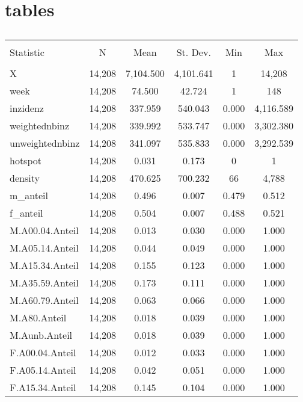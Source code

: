 \documentclass{article}
\begin{document}
\section{tables}

\begin{table}[!htbp] \centering 
  \caption{} 
  \label{} 
\begin{tabular}{@{\extracolsep{5pt}}lccccc} 
\\[-1.8ex]\hline 
\hline \\[-1.8ex] 
Statistic & \multicolumn{1}{c}{N} & \multicolumn{1}{c}{Mean} & \multicolumn{1}{c}{St. Dev.} & \multicolumn{1}{c}{Min} & \multicolumn{1}{c}{Max} \\ 
\hline \\[-1.8ex] 
X & 14,208 & 7,104.500 & 4,101.641 & 1 & 14,208 \\ 
week & 14,208 & 74.500 & 42.724 & 1 & 148 \\ 
inzidenz & 14,208 & 337.959 & 540.043 & 0.000 & 4,116.589 \\ 
weightednbinz & 14,208 & 339.992 & 533.747 & 0.000 & 3,302.380 \\ 
unweightednbinz & 14,208 & 341.097 & 535.833 & 0.000 & 3,292.539 \\ 
hotspot & 14,208 & 0.031 & 0.173 & 0 & 1 \\ 
density & 14,208 & 470.625 & 700.232 & 66 & 4,788 \\ 
m\_anteil & 14,208 & 0.496 & 0.007 & 0.479 & 0.512 \\ 
f\_anteil & 14,208 & 0.504 & 0.007 & 0.488 & 0.521 \\ 
M.A00.04.Anteil & 14,208 & 0.013 & 0.030 & 0.000 & 1.000 \\ 
M.A05.14.Anteil & 14,208 & 0.044 & 0.049 & 0.000 & 1.000 \\ 
M.A15.34.Anteil & 14,208 & 0.155 & 0.123 & 0.000 & 1.000 \\ 
M.A35.59.Anteil & 14,208 & 0.173 & 0.111 & 0.000 & 1.000 \\ 
M.A60.79.Anteil & 14,208 & 0.063 & 0.066 & 0.000 & 1.000 \\ 
M.A80.Anteil & 14,208 & 0.018 & 0.039 & 0.000 & 1.000 \\ 
M.Aunb.Anteil & 14,208 & 0.018 & 0.039 & 0.000 & 1.000 \\ 
F.A00.04.Anteil & 14,208 & 0.012 & 0.033 & 0.000 & 1.000 \\ 
F.A05.14.Anteil & 14,208 & 0.042 & 0.051 & 0.000 & 1.000 \\ 
F.A15.34.Anteil & 14,208 & 0.145 & 0.104 & 0.000 & 1.000 \\ 

\end{tabular}
\end{table}
\end{document}
